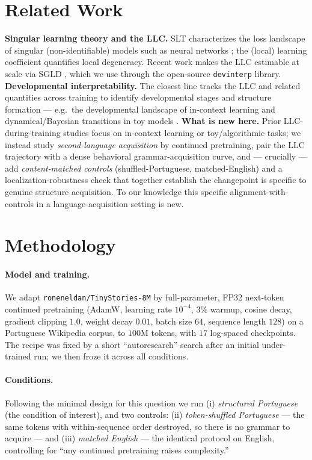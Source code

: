 \documentclass[11pt]{article}
\begin{document}
\section{Related Work}\label{sec:related}
\textbf{Singular learning theory and the LLC.} SLT characterizes the loss
landscape of singular (non-identifiable) models such as neural networks
\cite{watanabe2009}; the (local) learning coefficient quantifies local degeneracy.
Recent work makes the LLC estimable at scale via SGLD \cite{lau2024}, which we use
through the open-source \texttt{devinterp} library. \textbf{Developmental
interpretability.} The closest line tracks the LLC and related quantities across
training to identify developmental stages and structure formation --- e.g.\ the
developmental landscape of in-context learning \cite{hoogland2024} and
dynamical/Bayesian transitions in toy models \cite{chen2023}. \textbf{What is new
here.} Prior LLC-during-training studies focus on in-context learning or
toy/algorithmic tasks; we instead study \emph{second-language acquisition} by
continued pretraining, pair the LLC trajectory with a dense behavioral
grammar-acquisition curve, and --- crucially --- add \emph{content-matched controls}
(shuffled-Portuguese, matched-English) and a localization-robustness check that
together establish the changepoint is specific to genuine structure acquisition.
To our knowledge this specific alignment-with-controls in a language-acquisition
setting is new.

\section{Methodology}\label{sec:setup}
\paragraph{Model and training.} We adapt \texttt{roneneldan/TinyStories-8M} by
full-parameter, FP32 next-token continued pretraining (AdamW, learning rate
$10^{-4}$, $3\%$ warmup, cosine decay, gradient clipping $1.0$, weight decay
$0.01$, batch size $64$, sequence length $128$) on a Portuguese Wikipedia
corpus, to $100$M tokens, with $17$ log-spaced checkpoints. The recipe was fixed
by a short ``autoresearch'' search after an initial under-trained run; we then
froze it across all conditions.

\paragraph{Conditions.} Following the minimal design for this question we run
(i) \emph{structured Portuguese} (the condition of interest), and two controls:
(ii) \emph{token-shuffled Portuguese} --- the same tokens with within-sequence
order destroyed, so there is no grammar to acquire --- and (iii)
\emph{matched English} --- the identical protocol on English, controlling for
``any continued pretraining raises complexity.''
\end{document}
